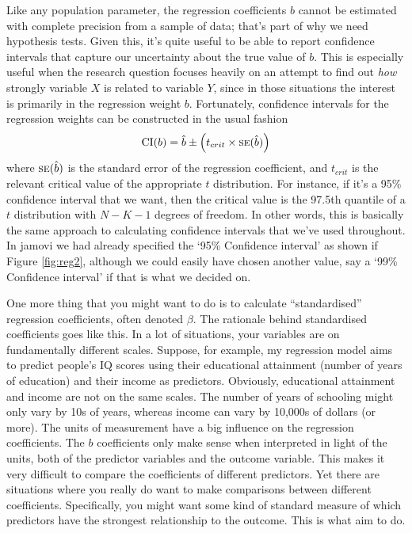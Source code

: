 
Like any population parameter, the regression coefficients $b$ cannot be estimated with complete precision from a sample of data; that's part of why we need hypothesis tests. Given this, it's quite useful to be able to report confidence intervals that capture our uncertainty about the true value of $b$. This is especially useful when the research question focuses heavily on an attempt to find out {\it how} strongly variable $X$ is related to variable $Y$, since in those situations the interest is primarily in the regression weight $b$. Fortunately, confidence intervals for the regression weights can be constructed in the usual fashion
$$
\mbox{CI}(b) = \hat{b} \pm \left( t_{crit} \times \mbox{\textsc{se}}(\hat{b})  \right)
$$
where $\mbox{\textsc{se}}(\hat{b})$ is the standard error of the regression coefficient, and $t_{crit}$ is the relevant critical value of the appropriate $t$ distribution. For instance, if it's a 95\% confidence interval that we want, then the critical value is the 97.5th quantile of a $t$ distribution with $N-K-1$ degrees of freedom.  In other words, this is basically the same approach to calculating confidence intervals that we've used throughout. In jamovi we had already specified the `95\% Confidence interval' as shown if Figure \ref{fig:reg2}, although we could easily have chosen another value, say a `99\% Confidence interval' if that is what we decided on. 



One more thing that you might want to do is to calculate ``standardised'' regression coefficients, often denoted $\beta$. The rationale behind standardised coefficients goes like this. In a lot of situations, your variables are on fundamentally different scales. Suppose, for example, my regression model aims to predict people's IQ scores using their educational attainment (number of years of education) and their income as predictors. Obviously, educational attainment and income are not on the same scales. The number of years of schooling might only vary by 10s of years, whereas income can vary by 10,000s of dollars (or more). The units of measurement have a big influence on the regression coefficients. The $b$ coefficients only make sense when interpreted in light of the units, both of the predictor variables and the outcome variable. This makes it very difficult to compare the coefficients of different predictors. Yet there are situations where you really do want to make comparisons between different coefficients. Specifically, you might want some kind of standard measure of which predictors have the strongest relationship to the outcome. This is what  aim to do. 

